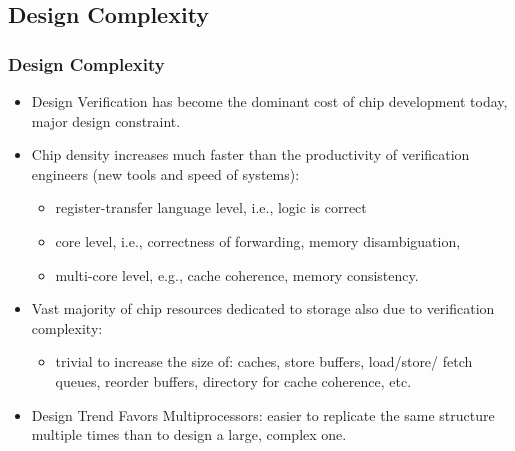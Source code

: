 \documentclass{beamer}
\renewcommand{\emph}[1]{\textcolor{structure}{#1}}
\newcommand{\emp}[1]{\textcolor{DikuRed}{ #1}}
\begin{document}
\subsection{Design Complexity}
\begin{frame}[fragile,t]
\frametitle{Design Complexity}

\begin{itemize}
    \item Design Verification has become the dominant cost of chip
            development today, major design constraint.\medskip

    \item \emp{Chip density increases much faster than the productivity 
                of verification engineers} (new tools and speed of systems):
            \begin{itemize}
            \item register-transfer language level, i.e., logic is correct 
            \item core level, i.e., correctness of forwarding, memory disambiguation,
            \item multi-core level, e.g., cache coherence, memory consistency.
            \end  {itemize}\medskip

    \item Vast majority of chip resources dedicated to storage
            also due to verification complexity:
            \begin{itemize}
            \item trivial to increase the size of: 
                caches, store buffers, load/store/ fetch queues, reorder buffers,
                    directory for cache coherence, etc.
            \end  {itemize}\medskip

    \item \emph{Design Trend Favors Multiprocessors:}
            easier to replicate the same structure multiple times
            than to design a large, complex one.
\end  {itemize}
\end{frame}
\end{document}
